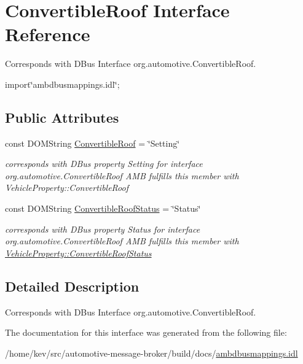 \hypertarget{interfaceConvertibleRoof}{\section{Convertible\+Roof Interface Reference}
\label{interfaceConvertibleRoof}
}


Corresponds with D\+Bus Interface org.\+automotive.\+Convertible\+Roof.  




{\ttfamily import\char`\"{}ambdbusmappings.\+idl\char`\"{};}

\subsection*{Public Attributes}
\begin{DoxyCompactItemize}
\item 
\hypertarget{interfaceConvertibleRoof_a97b477822f789851b728735ad8122e6e}{const D\+O\+M\+String \hyperlink{interfaceConvertibleRoof_a97b477822f789851b728735ad8122e6e}{Convertible\+Roof} = \char`\"{}Setting\char`\"{}}\label{interfaceConvertibleRoof_a97b477822f789851b728735ad8122e6e}

\begin{DoxyCompactList}\small\item\em corresponds with D\+Bus property Setting for interface org.\+automotive.\+Convertible\+Roof A\+M\+B fulfills this member with Vehicle\+Property\+::\+Convertible\+Roof \end{DoxyCompactList}\item 
\hypertarget{interfaceConvertibleRoof_a4fc60cf509edfff9f45cf2d024ed4e86}{const D\+O\+M\+String \hyperlink{interfaceConvertibleRoof_a4fc60cf509edfff9f45cf2d024ed4e86}{Convertible\+Roof\+Status} = \char`\"{}Status\char`\"{}}\label{interfaceConvertibleRoof_a4fc60cf509edfff9f45cf2d024ed4e86}

\begin{DoxyCompactList}\small\item\em corresponds with D\+Bus property Status for interface org.\+automotive.\+Convertible\+Roof A\+M\+B fulfills this member with \hyperlink{classVehicleProperty_a8b8ea675ff9353b181bd051beacc217e}{Vehicle\+Property\+::\+Convertible\+Roof\+Status} \end{DoxyCompactList}\end{DoxyCompactItemize}


\subsection{Detailed Description}
Corresponds with D\+Bus Interface org.\+automotive.\+Convertible\+Roof. 

The documentation for this interface was generated from the following file\+:\begin{DoxyCompactItemize}
\item 
/home/kev/src/automotive-\/message-\/broker/build/docs/\hyperlink{ambdbusmappings_8idl}{ambdbusmappings.\+idl}\end{DoxyCompactItemize}
